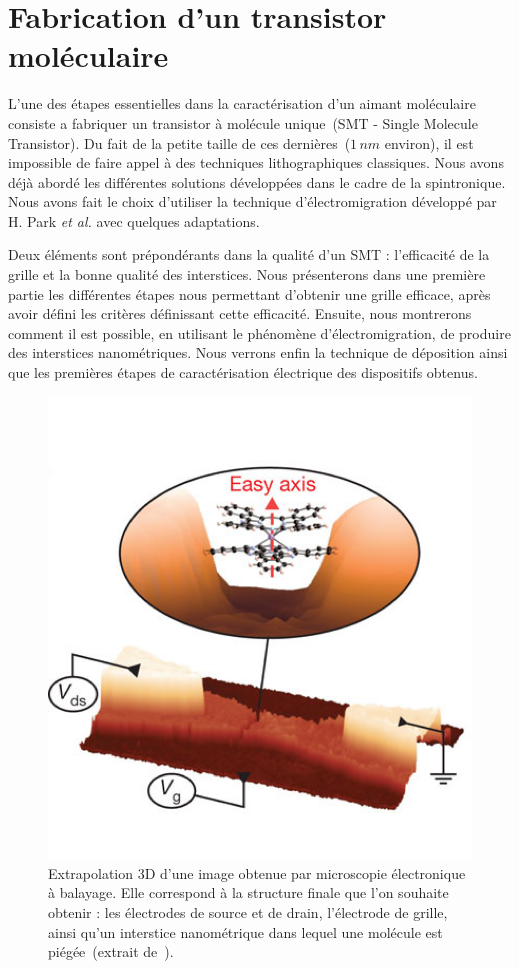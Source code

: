 \chapter{Fabrication d'un transistor moléculaire}

L'une des étapes essentielles dans la caractérisation d'un aimant moléculaire consiste a fabriquer un transistor à molécule unique~(SMT - Single Molecule Transistor). Du fait de la petite taille de ces dernières~($1\,nm$ environ), il est impossible de faire appel à des techniques lithographiques classiques. Nous avons déjà abordé les différentes solutions développées dans le cadre de la spintronique. Nous avons fait le choix d'utiliser la technique d'électromigration développé par H. Park \textit{et al.} avec quelques adaptations.

Deux éléments sont prépondérants dans la qualité d'un SMT : l’efficacité de la grille et la bonne qualité des interstices. Nous présenterons dans une première partie les différentes étapes nous permettant d'obtenir une grille efficace, après avoir défini les critères définissant cette efficacité. Ensuite, nous montrerons comment il est possible, en utilisant le phénomène d'électromigration, de produire des interstices nanométriques. Nous verrons enfin la technique de déposition ainsi que les premières étapes de caractérisation électrique des dispositifs obtenus.


\begin{figure}
\parbox{6.5cm}{
\includegraphics[scale=0.45]{Fabrication/ImageTrans/ImageTrans.pdf} 
}
\parbox{7cm}{\caption{Extrapolation 3D d'une image obtenue par microscopie électronique à balayage. Elle correspond à la structure finale que l'on souhaite obtenir : les électrodes de source et de drain, l'électrode de grille, ainsi qu'un interstice nanométrique dans lequel une molécule est piégée~(extrait de~\cite{Vincent2012}).}
\label{ImageTrans}
}
\end{figure}

